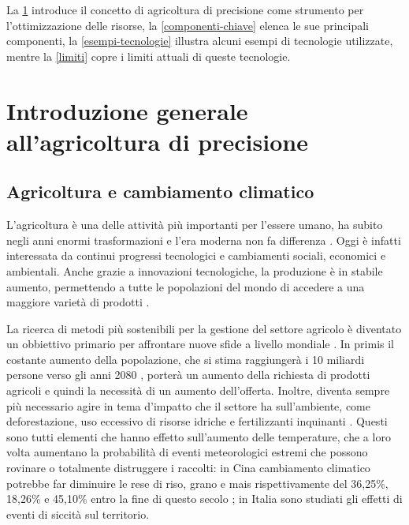 \documentclass[12pt,a4paper,openright,twoside]{book}
\begin{document}
La \cref{introduzione-agricoltura-precisione} introduce il concetto di agricoltura di precisione come strumento per l'ottimizzazione delle risorse, la \cref{componenti-chiave} elenca le sue principali componenti, la \cref{esempi-tecnologie} illustra alcuni esempi di tecnologie utilizzate, mentre la \cref{limiti} copre i limiti attuali di queste tecnologie.

\section{Introduzione generale all’agricoltura di precisione}\label{introduzione-agricoltura-precisione}

\subsection{Agricoltura e cambiamento climatico}

L'agricoltura è una delle attività più importanti per l'essere umano, ha subito negli anni enormi trasformazioni e l'era moderna non fa differenza \cite{FEDERICO-FEEDING-2005}. Oggi è infatti interessata da continui progressi tecnologici e cambiamenti sociali, economici e ambientali. Anche grazie a innovazioni tecnologiche, la produzione è in stabile aumento, permettendo a tutte le popolazioni del mondo di accedere a una maggiore varietà di prodotti \cite{FAO-AGRO-STATS-2023}.

La ricerca di metodi più sostenibili per la gestione del settore agricolo è diventato un obbiettivo primario per affrontare nuove sfide a livello mondiale \cite{SDG-2-4-1}. In primis il costante aumento della popolazione, che si stima raggiungerà i 10 miliardi persone verso gli anni 2080 \cite{UN-POPULATION-2024}, porterà un aumento della richiesta di prodotti agricoli e quindi la necessità di un aumento dell'offerta. Inoltre, diventa sempre più necessario agire in tema d'impatto che il settore ha sull'ambiente, come deforestazione, uso eccessivo di risorse idriche e fertilizzanti inquinanti \cite{EIOM-2012}. Questi sono tutti elementi che hanno effetto sull'aumento delle temperature, che a loro volta aumentano la probabilità di eventi meteorologici estremi che possono rovinare o totalmente distruggere i raccolti: in Cina cambiamento climatico potrebbe far diminuire le rese di riso, grano e mais rispettivamente del 36,25\%, 18,26\% e 45,10\% entro la fine di questo secolo \cite{ZHANG-PENG-2017}; in Italia sono studiati gli effetti di eventi di siccità sul territorio.
\end{document}
